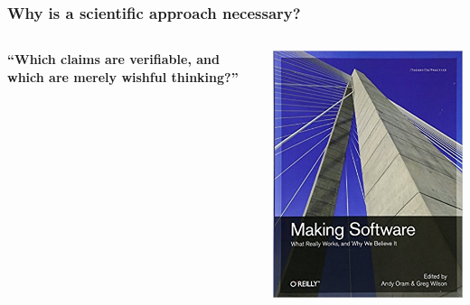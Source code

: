 \documentclass[xcolor=dvipsnames]{beamer}
\begin{document}
\begin{frame}
\frametitle{Why is a scientific approach necessary?}
\begin{columns}
\begin{column}{0.6\linewidth}
{\Large \bf ``Which claims are verifiable, and which are merely wishful
thinking?''}
\end{column}
\begin{column}{0.4\linewidth}
\includegraphics[width=0.9\linewidth]{figures/making_software.jpg}
\end{column}
\end{columns}
\end{frame}
\end{document}

